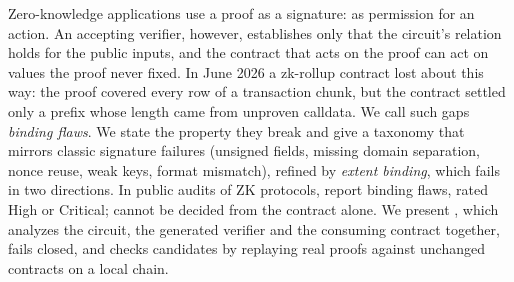 Zero-knowledge applications use a proof as a signature: as permission for an
action. An accepting verifier, however, establishes only that the circuit's
relation holds for the public inputs, and the contract that acts on the proof
can act on values the proof never fixed. In June 2026 a zk-rollup contract
lost about \usdM{\AztecLossUSD} this way: the proof covered every row of a
transaction chunk, but the contract settled only a prefix whose length came
from unproven calldata. We call such gaps \emph{binding flaws}. We state the
property they break and give a taxonomy that mirrors classic signature
failures (unsigned fields, missing domain separation, nonce reuse, weak keys,
format mismatch), refined by \emph{extent binding}, which fails in two
directions. In \RtwoAudits{} public audits of ZK protocols,
\RtwoBindingAudits{} report \RtwoBindingFindings{} binding flaws,
\RtwoHighCriticalBinding{} rated High or Critical;
\RtwoBindingNeedsCircuitShare{} cannot be decided from the contract alone. We
present \tool{}, which analyzes the circuit, the generated verifier and the
consuming contract together, fails closed, and checks candidates by
replaying real proofs against unchanged contracts on a local chain.
